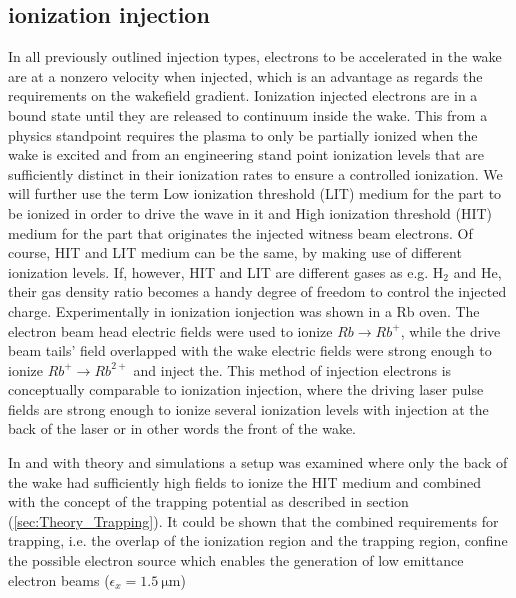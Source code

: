 \subsection{ionization injection}
In all previously outlined injection types, electrons to be accelerated in the wake are at a nonzero velocity when injected, which is an advantage as regards the requirements on the wakefield gradient. Ionization injected electrons are in a bound state until they are released to continuum inside the wake. This from a physics standpoint requires the plasma to only be partially ionized when the wake is excited and from an engineering stand point ionization levels that are sufficiently distinct in their ionization rates to ensure a controlled ionization. We will further use the term Low ionization threshold (LIT) medium for the part to be ionized in order to drive the wave in it and High ionization threshold (HIT) medium for the part that originates the injected witness beam electrons. Of course, HIT and LIT medium can be the same, by making use of different ionization levels. If, however, HIT and LIT are different gases as e.g. H$_2$ and He, their gas density ratio becomes a handy degree of freedom to control the injected charge.
Experimentally in \cite{Navid_distributed_PRL} ionization ionjection was shown in a Rb oven. The electron beam head electric fields were used to ionize $Rb\rightarrow Rb^+$, while the drive beam tails' field overlapped with the wake electric fields were strong enough to ionize $Rb^+ \rightarrow Rb^{2+}$ and inject the. This method of injection electrons is conceptually comparable to ionization injection, where the driving laser pulse fields are strong enough to ionize several ionization levels with injection at the back of the laser or in other words the front of the wake\cite{Pak_Ion_InjectionPRL2010}.

In \cite{Ossa_Rake_PRL2013} and \cite{MartinezdelaOssa2014231} with theory and simulations a setup was examined where only the back of the wake had sufficiently high fields to ionize the HIT medium and combined with the concept of the trapping potential as described in section (\ref{sec:Theory_Trapping}). It could be shown that the combined requirements for trapping, i.e. the overlap of the ionization region and the trapping region, confine the possible electron source which enables the generation of low emittance electron beams ($\epsilon_x=1.5\ \mathrm{\mu m}$) 




